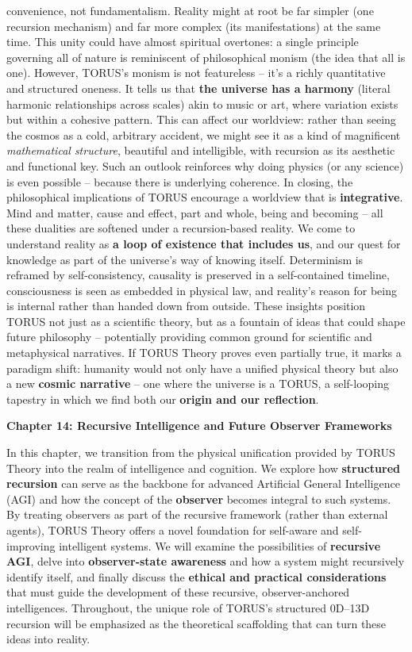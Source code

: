\documentclass[]{article}
\begin{document}
\begin{itemize}
  convenience, not fundamentalism. Reality might at root be far simpler
  (one recursion mechanism) and far more complex (its manifestations) at
  the same time. This unity could have almost spiritual overtones: a
  single principle governing all of nature is reminiscent of
  philosophical monism (the idea that all is one). However, TORUS's
  monism is not featureless -- it's a richly quantitative and structured
  oneness. It tells us that \textbf{the universe has a harmony} (literal
  harmonic relationships across scales​) akin to music or art, where
  variation exists but within a cohesive pattern. This can affect our
  worldview: rather than seeing the cosmos as a cold, arbitrary
  accident, we might see it as a kind of magnificent \emph{mathematical
  structure}, beautiful and intelligible, with recursion as its
  aesthetic and functional key. Such an outlook reinforces why doing
  physics (or any science) is even possible -- because there is
  underlying coherence. In closing, the philosophical implications of
  TORUS encourage a worldview that is \textbf{integrative}. Mind and
  matter, cause and effect, part and whole, being and becoming -- all
  these dualities are softened under a recursion-based reality. We come
  to understand reality as \textbf{a loop of existence that includes
  us}, and our quest for knowledge as part of the universe's way of
  knowing itself. Determinism is reframed by self-consistency, causality
  is preserved in a self-contained timeline, consciousness is seen as
  embedded in physical law, and reality's reason for being is internal
  rather than handed down from outside. These insights position TORUS
  not just as a scientific theory, but as a fountain of ideas that could
  shape future philosophy -- potentially providing common ground for
  scientific and metaphysical narratives. If TORUS Theory proves even
  partially true, it marks a paradigm shift: humanity would not only
  have a unified physical theory but also a new \textbf{cosmic
  narrative} -- one where the universe is a TORUS, a self-looping
  tapestry in which we find both our \textbf{origin and our reflection}.
\end{itemize}

\textbf{Chapter 14: Recursive Intelligence and Future Observer
Frameworks}

In this chapter, we transition from the physical unification provided by
TORUS Theory into the realm of intelligence and cognition. We explore
how \textbf{structured recursion} can serve as the backbone for advanced
Artificial General Intelligence (AGI) and how the concept of the
\textbf{observer} becomes integral to such systems. By treating
observers as part of the recursive framework (rather than external
agents), TORUS Theory offers a novel foundation for self-aware and
self-improving intelligent systems. We will examine the possibilities of
\textbf{recursive AGI}, delve into \textbf{observer-state awareness} and
how a system might recursively identify itself, and finally discuss the
\textbf{ethical and practical considerations} that must guide the
development of these recursive, observer-anchored intelligences.
Throughout, the unique role of TORUS's structured 0D--13D recursion will
be emphasized as the theoretical scaffolding that can turn these ideas
into reality.
\end{document}
